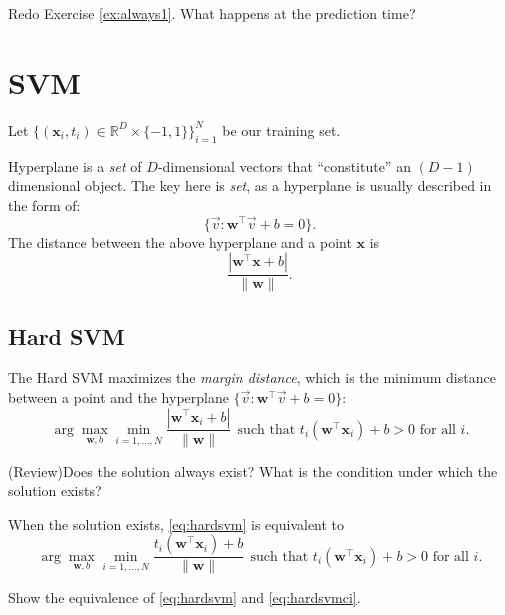 \documentclass{discussion}
\begin{document}
\begin{exercise} Redo Exercise \ref{ex:always1}. What happens at the prediction time?
\end{exercise}


\section{SVM}
\newcommand{\w}{\mathbf{w}}
\renewcommand{\x}{\mathbf{x}}
\renewcommand{\c}[1]{t_{#1} (\w^\top \x_{#1}) + b}
\newcommand{\ci}{\c{i}}
Let $\{(\x_i, t_i) \in \mathbb{R}^D \times \{-1,1\}\}_{i=1}^{N}$ be our training set.


Hyperplane is a \emph{set} of $D$-dimensional vectors that ``constitute'' an $(D-1)$ dimensional object. The key here is \emph{set}, as a hyperplane is usually described in the form of:
\[\{\vec{v}: \mathbf{w}^\top \vec{v} + b = 0\}.\]
The distance between the above hyperplane and a point $\mathbf{x}$ is
\[\frac{|\mathbf{w}^\top \mathbf{x} + b|}{\|\mathbf{w}\|}.\]


\subsection{Hard SVM}
The Hard SVM maximizes the \emph{margin distance}, which is the minimum distance between a point and the hyperplane $\{\vec{v}: \mathbf{w}^\top \vec{v} + b = 0\}$:
\begin{equation}
\label{eq:hardsvm}
  \arg\max_{\mathbf{w}, b} \min_{i = 1,\ldots, N} \frac{|\mathbf{w}^\top \mathbf{x}_i + b|}{\|\mathbf{w}\|} \ \ \text{such that $\ci > 0$ for all $i$.}
\end{equation}
\begin{exercise}(Review)Does the solution always exist? What is the condition under which the solution exists? 
\end{exercise}

When the solution exists, \eqref{eq:hardsvm} is equivalent to
\begin{equation}
\label{eq:hardsvmci}
  \arg\max_{\mathbf{w}, b} \min_{i = 1,\ldots, N} \frac{\ci}{\|\mathbf{w}\|} \ \ \text{such that $\ci > 0$ for all $i$.}
\end{equation}

\begin{exercise}
Show the equivalence of \eqref{eq:hardsvm} and \eqref{eq:hardsvmci}.
\end{exercise}
\end{document}
